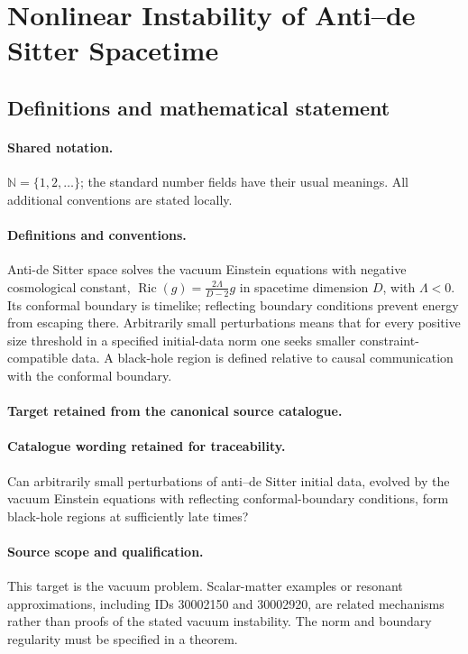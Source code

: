 \documentclass[11pt]{article}
\begin{document}
\section{Nonlinear Instability of Anti–de Sitter Spacetime}\label{statement}

\subsection{Definitions and mathematical statement}

\paragraph{Shared notation.}$\mathbb N=\{1,2,\ldots\}$; the standard number fields have their usual meanings. All additional conventions are stated locally.


\paragraph{Definitions and conventions.}
Anti-de Sitter space solves the vacuum Einstein equations with negative cosmological constant, $\operatorname{Ric}(g)=\frac{2\Lambda}{D-2}g$ in spacetime dimension $D$, with $\Lambda<0$. Its conformal boundary is timelike; reflecting boundary conditions prevent energy from escaping there. Arbitrarily small perturbations means that for every positive size threshold in a specified initial-data norm one seeks smaller constraint-compatible data. A black-hole region is defined relative to causal communication with the conformal boundary.

\paragraph{Target retained from the canonical source catalogue.}
\paragraph{Catalogue wording retained for traceability.}
Can arbitrarily small perturbations of anti–de Sitter initial data, evolved by the vacuum Einstein equations with reflecting conformal-boundary conditions, form black-hole regions at sufficiently late times?

\paragraph{Source scope and qualification.}
This target is the vacuum problem. Scalar-matter examples or resonant approximations, including IDs 30002150 and 30002920, are related mechanisms rather than proofs of the stated vacuum instability. The norm and boundary regularity must be specified in a theorem.
\end{document}
